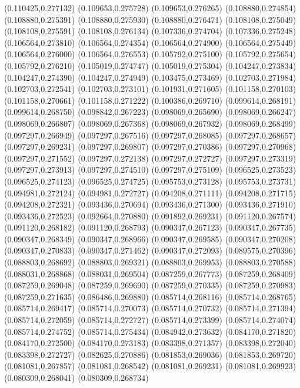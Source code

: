 (0.110425,0.277132)
(0.109653,0.275728)
(0.109653,0.276265)
(0.108880,0.274854)
(0.108880,0.275391)
(0.108880,0.275930)
(0.108880,0.276471)
(0.108108,0.275049)
(0.108108,0.275591)
(0.108108,0.276134)
(0.107336,0.274704)
(0.107336,0.275248)
(0.106564,0.273810)
(0.106564,0.274354)
(0.106564,0.274900)
(0.106564,0.275449)
(0.106564,0.276000)
(0.106564,0.276553)
(0.105792,0.275100)
(0.105792,0.275654)
(0.105792,0.276210)
(0.105019,0.274747)
(0.105019,0.275304)
(0.104247,0.273834)
(0.104247,0.274390)
(0.104247,0.274949)
(0.103475,0.273469)
(0.102703,0.271984)
(0.102703,0.272541)
(0.102703,0.273101)
(0.101931,0.271605)
(0.101158,0.270103)
(0.101158,0.270661)
(0.101158,0.271222)
(0.100386,0.269710)
(0.099614,0.268191)
(0.099614,0.268750)
(0.098842,0.267223)
(0.098069,0.265690)
(0.098069,0.266247)
(0.098069,0.266807)
(0.098069,0.267368)
(0.098069,0.267932)
(0.098069,0.268499)
(0.097297,0.266949)
(0.097297,0.267516)
(0.097297,0.268085)
(0.097297,0.268657)
(0.097297,0.269231)
(0.097297,0.269807)
(0.097297,0.270386)
(0.097297,0.270968)
(0.097297,0.271552)
(0.097297,0.272138)
(0.097297,0.272727)
(0.097297,0.273319)
(0.097297,0.273913)
(0.097297,0.274510)
(0.097297,0.275109)
(0.096525,0.273523)
(0.096525,0.274123)
(0.096525,0.274725)
(0.095753,0.273128)
(0.095753,0.273731)
(0.094981,0.272124)
(0.094981,0.272727)
(0.094208,0.271111)
(0.094208,0.271715)
(0.094208,0.272321)
(0.093436,0.270694)
(0.093436,0.271300)
(0.093436,0.271910)
(0.093436,0.272523)
(0.092664,0.270880)
(0.091892,0.269231)
(0.091120,0.267574)
(0.091120,0.268182)
(0.091120,0.268793)
(0.090347,0.267123)
(0.090347,0.267735)
(0.090347,0.268349)
(0.090347,0.268966)
(0.090347,0.269585)
(0.090347,0.270208)
(0.090347,0.270833)
(0.090347,0.271462)
(0.090347,0.272093)
(0.089575,0.270396)
(0.088803,0.268692)
(0.088803,0.269321)
(0.088803,0.269953)
(0.088803,0.270588)
(0.088031,0.268868)
(0.088031,0.269504)
(0.087259,0.267773)
(0.087259,0.268409)
(0.087259,0.269048)
(0.087259,0.269690)
(0.087259,0.270335)
(0.087259,0.270983)
(0.087259,0.271635)
(0.086486,0.269880)
(0.085714,0.268116)
(0.085714,0.268765)
(0.085714,0.269417)
(0.085714,0.270073)
(0.085714,0.270732)
(0.085714,0.271394)
(0.085714,0.272059)
(0.085714,0.272727)
(0.085714,0.273399)
(0.085714,0.274074)
(0.085714,0.274752)
(0.085714,0.275434)
(0.084942,0.273632)
(0.084170,0.271820)
(0.084170,0.272500)
(0.084170,0.273183)
(0.083398,0.271357)
(0.083398,0.272040)
(0.083398,0.272727)
(0.082625,0.270886)
(0.081853,0.269036)
(0.081853,0.269720)
(0.081081,0.267857)
(0.081081,0.268542)
(0.081081,0.269231)
(0.081081,0.269923)
(0.080309,0.268041)
(0.080309,0.268734)
